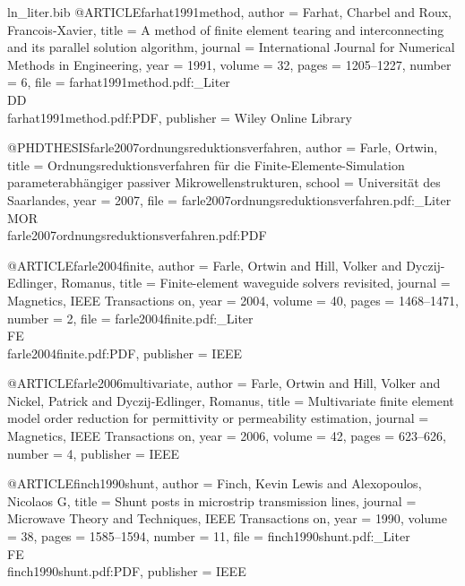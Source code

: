 \begin{filecontents*}{ln_liter.bib}
@ARTICLE{farhat1991method,
  author = {Farhat, Charbel and Roux, Francois-Xavier},
  title = {A method of finite element tearing and interconnecting and its parallel
	solution algorithm},
  journal = {International Journal for Numerical Methods in Engineering},
  year = {1991},
  volume = {32},
  pages = {1205--1227},
  number = {6},
  file = {farhat1991method.pdf:_Liter\\DD\\farhat1991method.pdf:PDF},
  publisher = {Wiley Online Library}
}

@PHDTHESIS{farle2007ordnungsreduktionsverfahren,
  author = {Farle, Ortwin},
  title = {Ordnungsreduktionsverfahren f{\"u}r die Finite-Elemente-Simulation
	parameterabh{\"a}ngiger passiver Mikrowellenstrukturen},
  school = {Universit\"at des Saarlandes},
  year = {2007},
  file = {farle2007ordnungsreduktionsverfahren.pdf:_Liter\\MOR\\farle2007ordnungsreduktionsverfahren.pdf:PDF}
}

@ARTICLE{farle2004finite,
  author = {Farle, Ortwin and Hill, Volker and Dyczij-Edlinger, Romanus},
  title = {Finite-element waveguide solvers revisited},
  journal = {Magnetics, IEEE Transactions on},
  year = {2004},
  volume = {40},
  pages = {1468--1471},
  number = {2},
  file = {farle2004finite.pdf:_Liter\\FE\\farle2004finite.pdf:PDF},
  publisher = {IEEE}
}

@ARTICLE{farle2006multivariate,
  author = {Farle, Ortwin and Hill, Volker and Nickel, Patrick and Dyczij-Edlinger,
	Romanus},
  title = {Multivariate finite element model order reduction for permittivity
	or permeability estimation},
  journal = {Magnetics, IEEE Transactions on},
  year = {2006},
  volume = {42},
  pages = {623--626},
  number = {4},
  publisher = {IEEE}
}

@ARTICLE{finch1990shunt,
  author = {Finch, Kevin Lewis and Alexopoulos, Nicolaos G},
  title = {Shunt posts in microstrip transmission lines},
  journal = {Microwave Theory and Techniques, IEEE Transactions on},
  year = {1990},
  volume = {38},
  pages = {1585--1594},
  number = {11},
  file = {finch1990shunt.pdf:_Liter\\FE\\finch1990shunt.pdf:PDF},
  publisher = {IEEE}
}


\end{filecontents*}
